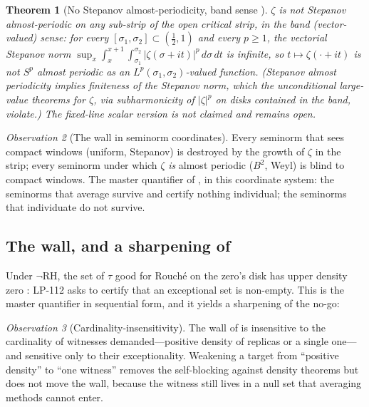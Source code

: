 \documentclass[11pt]{amsart}
\newtheorem{theorem}{Theorem}[section]
\theoremstyle{definition}
\theoremstyle{remark}
\newtheorem{observation}[theorem]{Observation}
\newcommand{\RH}{\mathrm{RH}}
\begin{document}
\begin{theorem}[No Stepanov almost-periodicity, band sense {\cite[Thm~5.2]{P40}}]
\label{thm:stepanov}
$\zeta$ is not Stepanov almost-periodic on any sub-strip of the open
critical strip, in the band (vector-valued) sense: for every
$[\sigma_1,\sigma_2]\subset(\tfrac12,1)$ and every $p\geq1$, the vectorial
Stepanov norm
$\sup_x\int_x^{x+1}\!\!\int_{\sigma_1}^{\sigma_2}|\zeta(\sigma+it)|^p\,
d\sigma\,dt$ is infinite, so $t\mapsto\zeta(\cdot+it)$ is not $S^p$ almost
periodic as an $L^p(\sigma_1,\sigma_2)$-valued function. (Stepanov almost
periodicity implies finiteness of the Stepanov norm, which the
unconditional large-value theorems for $\zeta$, via subharmonicity of
$|\zeta|^p$ on disks contained in the band, violate.) The fixed-line scalar
version is not claimed and remains open.
\end{theorem}

\begin{observation}[The wall in seminorm coordinates]\label{obs:seminorm}
Every seminorm that sees compact windows (uniform, Stepanov) is destroyed
by the growth of $\zeta$ in the strip; every seminorm under which $\zeta$
\emph{is} almost periodic ($B^2$, Weyl) is blind to compact windows. The
master quantifier of \cite{P43}, in this coordinate system: the seminorms
that average survive and certify nothing individual; the seminorms that
individuate do not survive.
\end{observation}

\subsection{The wall, and a sharpening of \cite{P43}}\label{ssec:wall}
Under $\neg\RH$, the set of $\tau$ good for Rouch\'e on the zero's disk has
upper density zero \cite[Prop.~2.6]{P40}: LP-112 asks to certify
that an exceptional set is non-empty. This is the master quantifier in
sequential form, and it yields a sharpening of the no-go:

\begin{observation}[Cardinality-insensitivity]\label{obs:cardinal}
The wall of \cite{P43} is insensitive to the cardinality of witnesses
demanded---positive density of replicas or a single one---and sensitive
only to their exceptionality. Weakening a target from ``positive density''
to ``one witness'' removes the self-blocking against density theorems
\cite[]{P40} but does not move the wall, because the witness still
lives in a null set that averaging methods cannot enter.
\end{observation}
\end{document}

